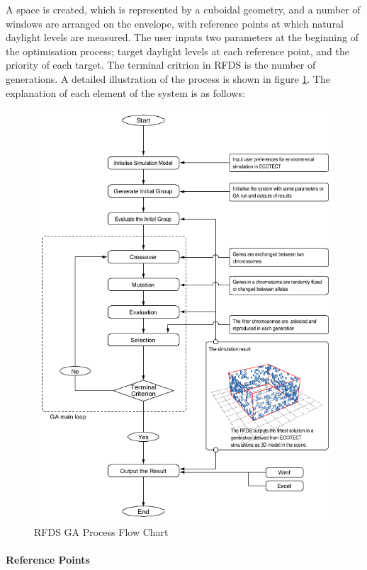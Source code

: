 A space is created, which is represented by a cuboidal geometry, and a number of windows are arranged on the envelope, with reference points at which natural daylight levels are measured. The user inputs two parameters at the beginning of the optimisation process; target daylight levels at each reference point, and the priority of each target. The terminal critrion in RFDS is the number of generations. A detailed illustration of the process is shown in figure \ref{kawakitaGA}. The explanation of each element of the system is as follows:

\begin{figure}[hbtp]
\centering
\includegraphics[width=\textwidth]{../Chapter3/Images/16-kawakitaGA}
\caption[RFDS GA Process Flow Chart]{RFDS GA Process Flow Chart \cite{kawakita08}}
\label{kawakitaGA}
\end{figure}


\paragraph{Reference Points}\mbox{}

